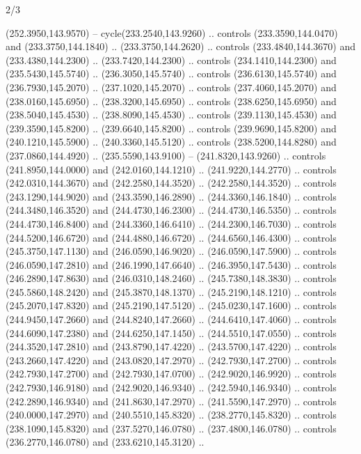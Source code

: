 \begin{flagdescription}{2/3}
\begin{scope}[xshift=0.5\flaglength,yshift=0.5\flagwidth,scale=\flagwidth/259.2]
\begin{scope}[y=0.8pt, x=0.8pt, yscale=-1,shift={(-243,-162)}]
      (252.3950,143.9570) -- cycle(233.2540,143.9260) .. controls
      (233.3590,144.0470) and (233.3750,144.1840) .. (233.3750,144.2620) .. controls
      (233.4840,144.3670) and (233.4380,144.2300) .. (233.7420,144.2300) .. controls
      (234.1410,144.2300) and (235.5430,145.5740) .. (236.3050,145.5740) .. controls
      (236.6130,145.5740) and (236.7930,145.2070) .. (237.1020,145.2070) .. controls
      (237.4060,145.2070) and (238.0160,145.6950) .. (238.3200,145.6950) .. controls
      (238.6250,145.6950) and (238.5040,145.4530) .. (238.8090,145.4530) .. controls
      (239.1130,145.4530) and (239.3590,145.8200) .. (239.6640,145.8200) .. controls
      (239.9690,145.8200) and (240.1210,145.5900) .. (240.3360,145.5120) .. controls
      (238.5200,144.8280) and (237.0860,144.4920) .. (235.5590,143.9100) --
      (241.8320,143.9260) .. controls (241.8950,144.0000) and (242.0160,144.1210) ..
      (241.9220,144.2770) .. controls (242.0310,144.3670) and (242.2580,144.3520) ..
      (242.2580,144.3520) .. controls (243.1290,144.9020) and (243.3590,146.2890) ..
      (244.3360,146.1840) .. controls (244.3480,146.3520) and (244.4730,146.2300) ..
      (244.4730,146.5350) .. controls (244.4730,146.8400) and (244.3360,146.6410) ..
      (244.2300,146.7030) .. controls (244.5200,146.6720) and (244.4880,146.6720) ..
      (244.6560,146.4300) .. controls (245.3750,147.1130) and (246.0590,146.9020) ..
      (246.0590,147.5900) .. controls (246.0590,147.2810) and (246.1990,147.6640) ..
      (246.3950,147.5430) .. controls (246.2890,147.8630) and (246.0310,148.2460) ..
      (245.7380,148.3830) .. controls (245.5860,148.2420) and (245.3870,148.1370) ..
      (245.2190,148.1210) .. controls (245.2070,147.8320) and (245.2190,147.5120) ..
      (245.0230,147.1600) .. controls (244.9450,147.2660) and (244.8240,147.2660) ..
      (244.6410,147.4060) .. controls (244.6090,147.2380) and (244.6250,147.1450) ..
      (244.5510,147.0550) .. controls (244.3520,147.2810) and (243.8790,147.4220) ..
      (243.5700,147.4220) .. controls (243.2660,147.4220) and (243.0820,147.2970) ..
      (242.7930,147.2700) .. controls (242.7930,147.2700) and (242.7930,147.0700) ..
      (242.9020,146.9920) .. controls (242.7930,146.9180) and (242.9020,146.9340) ..
      (242.5940,146.9340) .. controls (242.2890,146.9340) and (241.8630,147.2970) ..
      (241.5590,147.2970) .. controls (240.0000,147.2970) and (240.5510,145.8320) ..
      (238.2770,145.8320) .. controls (238.1090,145.8320) and (237.5270,146.0780) ..
      (237.4800,146.0780) .. controls (236.2770,146.0780) and (233.6210,145.3120) ..

\end{scope}
\end{scope}
\end{flagdescription}

